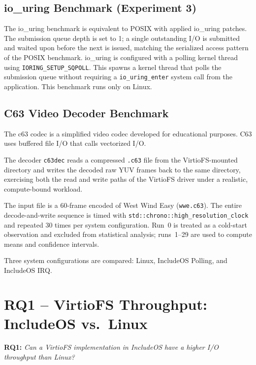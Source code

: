 \documentclass[12pt, a4paper, oneside]{report}
\begin{document}
\subsection{io\_uring Benchmark (Experiment 3)}
\label{sec:iouring_setup}

The io\_uring benchmark is equivalent to POSIX with applied io\_uring patches. The submission queue depth is set to 1; a single outstanding I/O is submitted and waited upon before the next is issued, matching the serialized access pattern of the POSIX benchmark. io\_uring is configured with a polling kernel thread using \texttt{IORING\_SETUP\_SQPOLL}. This spawns a kernel thread that polls the submission queue without requiring a \texttt{io\_uring\_enter} system call from the application. This benchmark runs only on Linux. 

\subsection{C63 Video Decoder Benchmark}
\label{sec:c63dec_setup}

The c63 codec is a simplified video codec developed for educational
purposes. C63 uses buffered file I/O that calls vectorized I/O.

The decoder \texttt{c63dec} reads a compressed \texttt{.c63} file
from the VirtioFS-mounted directory and writes the decoded raw YUV frames back
to the same directory, exercising both the read and write paths of the VirtioFS
driver under a realistic, compute-bound workload.

The input file is a 60-frame encoded of West Wind Easy (\texttt{wwe.c63}).
The entire decode-and-write sequence is timed with
\texttt{std::chrono::high\_resolution\_clock} and repeated 30 times per system
configuration.  Run~0 is treated as a cold-start observation and excluded from
statistical analysis; runs~1--29 are used to compute means and confidence
intervals.


Three system configurations are compared: Linux, IncludeOS Polling, and
IncludeOS IRQ.

\section{RQ1 -- VirtioFS Throughput: IncludeOS vs.\ Linux}
\label{sec:rq1}

\textbf{RQ1:} \emph{Can a VirtioFS implementation in IncludeOS have a higher I/O
throughput than Linux?}
\end{document}
